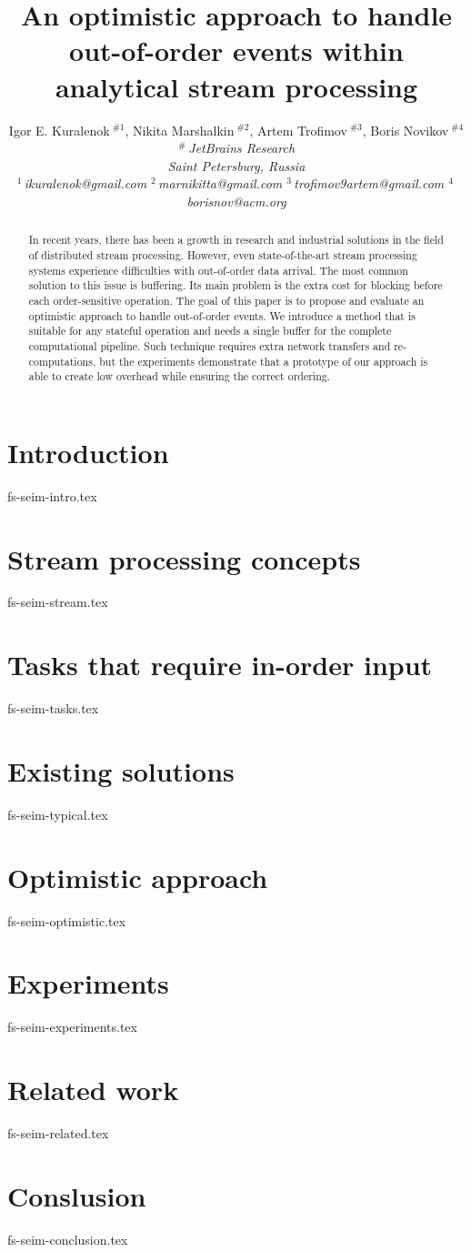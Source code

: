 \documentclass[10pt,conference,letterpaper]{IEEEtran}
\title{An optimistic approach to handle out-of-order events within analytical stream processing}
\author{%
{Igor E. Kuralenok{\small $~^{\#1}$}, 
    Nikita Marshalkin{\small $~^{\#2}$},
    Artem Trofimov{\small $~^{\#3}$}, 
        Boris Novikov{\small $~^{\#4}$} }%
\vspace{1.6mm}\\
\fontsize{10}{10}\selectfont\itshape
$^{\#}$\,JetBrains Research\\
Saint Petersburg, Russia\\
\fontsize{9}{9}\selectfont\ttfamily\upshape
%
$^1$\,ikuralenok@gmail.com   %
$^2$\,marnikitta@gmail.com    %
$^3$\,trofimov9artem@gmail.com   %
$^4$\,borisnov@acm.org 
}
\begin{document}
\maketitle
%
\begin{abstract} 
In recent years, there has been a growth in research and industrial solutions in the field of distributed stream processing. However, even state-of-the-art stream processing systems experience difficulties with out-of-order data arrival. The most common solution to this issue is buffering. Its main problem is the extra cost for blocking before each order-sensitive operation. The goal of this paper is to propose and evaluate an optimistic approach to handle out-of-order events. We introduce a method that is suitable for any stateful operation and needs a single buffer for the complete computational pipeline. Such technique requires extra network transfers and re-computations, but the experiments demonstrate that a prototype of our approach is able to create low overhead while ensuring the correct ordering.
\end{abstract}

%
\section {Introduction}
 {fs-seim-intro.tex}

\section{Stream processing concepts}
 {fs-seim-stream.tex}

\section{Tasks that require in-order input}
 {fs-seim-tasks.tex}

\section{Existing solutions}
 {fs-seim-typical.tex}

\section{Optimistic approach}
 {fs-seim-optimistic.tex}

\section{Experiments}
 {fs-seim-experiments.tex}

\section{Related work}
 {fs-seim-related.tex}

\section{Conslusion}
 {fs-seim-conclusion.tex}



\end{document}
